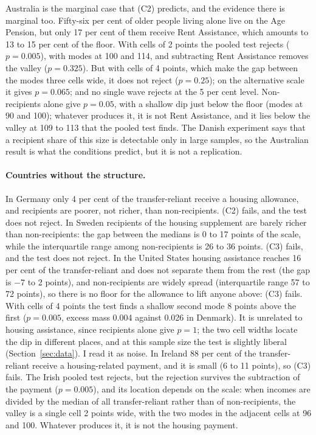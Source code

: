 Australia is the marginal case that (C2) predicts, and the evidence there is marginal too. Fifty-six per cent of older people living alone live on the Age Pension, but only 17 per cent of them receive Rent Assistance, which amounts to 13 to 15 per cent of the floor. With cells of 2 points the pooled test rejects ($p=0.005$), with modes at 100 and 114, and subtracting Rent Assistance removes the valley ($p=0.325$). But with cells of 4 points, which make the gap between the modes three cells wide, it does not reject ($p=0.25$); on the alternative scale it gives $p=0.065$; and no single wave rejects at the 5 per cent level. Non-recipients alone give $p=0.05$, with a shallow dip just below the floor (modes at 90 and 100); whatever produces it, it is not Rent Assistance, and it lies below the valley at 109 to 113 that the pooled test finds. The Danish experiment says that a recipient share of this size is detectable only in large samples, so the Australian result is what the conditions predict, but it is not a replication.

\paragraph{Countries without the structure.} In Germany only 4 per cent of the transfer-reliant receive a housing allowance, and recipients are poorer, not richer, than non-recipients. (C2) fails, and the test does not reject. In Sweden recipients of the housing supplement are barely richer than non-recipients: the gap between the medians is 0 to 17 points of the scale, while the interquartile range among non-recipients is 26 to 36 points. (C3) fails, and the test does not reject.  In the United States housing assistance reaches 16 per cent of the transfer-reliant and does not separate them from the rest (the gap is $-7$ to 2 points), and non-recipients are widely spread (interquartile range 57 to 72 points), so there is no floor for the allowance to lift anyone above: (C3) fails. With cells of 4 points the test finds a shallow second mode 8 points above the first ($p=0.005$, excess mass 0.004 against 0.026 in Denmark). It is unrelated to housing assistance, since recipients alone give $p=1$; the two cell widths locate the dip in different places, and at this sample size the test is slightly liberal (Section~\ref{sec:data}). I read it as noise. In Ireland 88 per cent of the transfer-reliant receive a housing-related payment, and it is small (6 to 11 points), so (C3) fails. The Irish pooled test rejects, but the rejection survives the subtraction of the payment ($p=0.005$), and its location depends on the scale: when incomes are divided by the median of all transfer-reliant rather than of non-recipients, the valley is a single cell 2 points wide, with the two modes in the adjacent cells at 96 and 100. Whatever produces it, it is not the housing payment.

